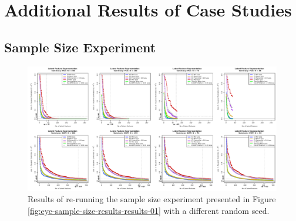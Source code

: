 \section{Additional Results of Case Studies}\label{sec:additional-results}

\subsection{Sample Size Experiment}

\begin{figure}
    \centering
    \includegraphics[width=1\linewidth]{figures/eye-sample-size-results-results-02.pdf}
    \caption{Results of re-running the sample size experiment presented in Figure \ref{fig:eye-sample-size-results-results-01} with a different random seed.}
    \label{fig:eye-sample-size-results-results-02}
\end{figure}